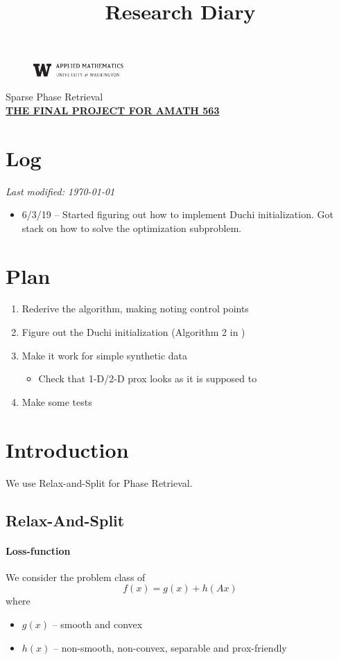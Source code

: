 \documentclass[11pt,letterpaper]{article}
\newcommand{\projectNameShort}{Sparse Phase Retrieval}
\newcommand{\projectNameLong}{The Final Project for AMATH 563}
\newcommand{\univlogo}{%
  \noindent %
  \begin{figure}
    \vspace{-24pt}
    \begin{center}
      \includegraphics[width=0.31\textwidth]{Images/univ-logo.jpg}
    \end{center}
    \vspace{-10pt}
  \end{figure}
}
\numberwithin{equation}{section} %
\numberwithin{figure}{section} %
\numberwithin{table}{section} %
\begin{document}
\title{Research Diary}
\univlogo
{\Huge \projectNameShort}\\[2mm]

{\large \underline{\textbf{\uppercase{\projectNameLong}}}}\\

\section*{Log}
\textit{Last modified: \today}
\begin{itemize}
    \item 6/3/19 -- Started figuring out how to implement Duchi initialization. Got stack on how to solve the optimization subproblem. 
\end{itemize}

\section*{Plan}
\begin{enumerate}
    \item Rederive the algorithm, making noting control points
    \item Figure out the Duchi initialization (Algorithm 2 in \cite{Duchi2017PhaseRetrival})
    \item Make it work for simple synthetic data
        \begin{itemize}
            \item Check that 1-D/2-D prox looks as it is supposed to 
        \end{itemize}
    \item Make some tests
\end{enumerate}

\listoftodos

\newpage

\section*{Introduction} 
We use Relax-and-Split for Phase Retrieval. 


\subsection*{Relax-And-Split}
    \paragraph{Loss-function} We consider the problem class of
    \[
        f(x) = g(x) + h(Ax)
    \]
    where 
    \begin{itemize}
        \item $g(x)$ -- smooth and convex 
        \item $h(x)$ -- non-smooth, non-convex, separable and prox-friendly 
    \end{itemize}
    
\end{document}
